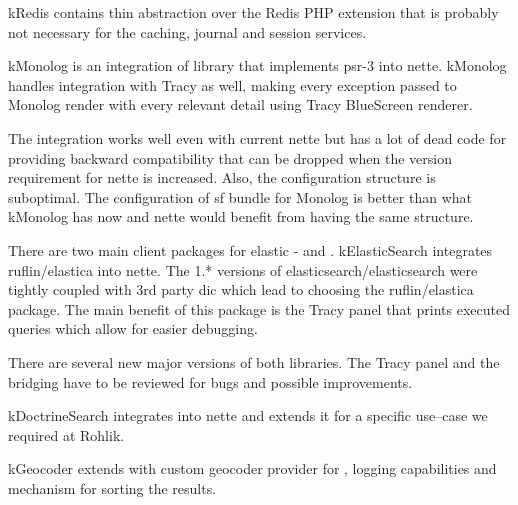 \gls{kRedis} contains thin abstraction over the Redis PHP extension that is probably not necessary for the caching, journal and session services.

 \label{sec:state:monolog}

\gls{kMonolog} is an integration of  library that implements \gls{psr}-3 into \gls{nette}. \gls{kMonolog} handles integration with Tracy as well, making every exception passed to Monolog render with every relevant detail using Tracy BlueScreen renderer.

The integration works well even with current \gls{nette} but has a lot of dead code for providing backward compatibility that can be dropped when the version requirement for \gls{nette} is increased. Also, the configuration structure is suboptimal. The configuration of \gls{sf} bundle for Monolog is better than what \gls{kMonolog} has now and \gls{nette} would benefit from having the same structure.

 \label{sec:state:elastic-search}

There are two main client packages for \gls{elastic} -  and . \gls{kElasticSearch} integrates ruflin/elastica into \gls{nette}. The 1.* versions of elasticsearch/elasticsearch were tightly coupled with 3rd party \gls{dic} which lead to choosing the ruflin/elastica package. The main benefit of this package is the Tracy panel that prints executed queries which allow for easier debugging.

There are several new major versions of both libraries. The Tracy panel and the bridging have to be reviewed for bugs and possible improvements.

 \label{sec:state:doctrine-search}

\gls{kDoctrineSearch} integrates  into \gls{nette} and extends it for a specific use--case we required at Rohlik.

 \label{sec:state:geocoder}

\gls{kGeocoder} extends  with custom geo\-co\-de\-r provider for , logging capabilities and mechanism for sorting the results.

